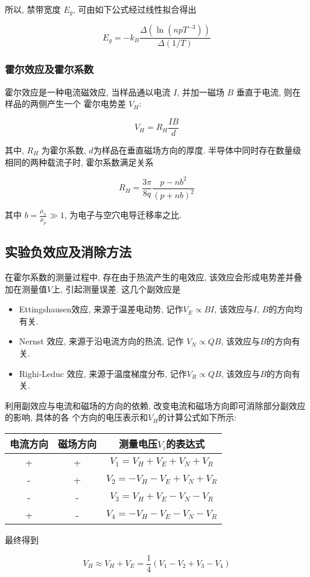 \documentclass[12pt,a4paper]{article}
\newcommand{\be}[1]{
    \begin{equation}
        #1
    \end{equation}
}
\begin{document}
所以, 禁带宽度 $E_g$, 可由如下公式经过线性拟合得出
\be{E_{g}=-k_{B} \frac{\Delta\left(\ln \left(n p T^{-3}\right)\right)}{\Delta(1 / T)}}

\subsubsection{霍尔效应及霍尔系数}
霍尔效应是一种电流磁效应, 当样品通以电流 $I$, 并加一磁场 $B$ 垂直于电流, 则在样品的两侧产生一个
霍尔电势差 $V_H$:
\be{V_{H}=R_{H} \frac{I B}{d}}
其中, $R_H$ 为霍尔系数, $d$为样品在垂直磁场方向的厚度.
半导体中同时存在数量级相同的两种载流子时, 霍尔系数满足关系
\be{R_{H}=\frac{3 \pi}{8 q} \frac{p-n b^{2}}{(p+n b)^{2}}}
其中 $b =\frac{\mu_n}{\mu_p}\gg 1$, 为电子与空穴电导迁移率之比.

\subsection{实验负效应及消除方法}
在霍尔系数的测量过程中, 存在由于热流产生的电效应, 该效应会形成电势差并叠加在测量值$V$上,
引起测量误差. 这几个副效应是
\begin{itemize}
    \item Ettingshausen效应, 来源于温差电动势, 记作$ V_E\propto  BI$, 该效应与$I$, $B$的方向均有关.
    \item Nernst 效应, 来源于沿电流方向的热流, 记作 $V_N \propto QB$, 该效应与$B$的方向有关.
    \item Righi-Leduc 效应, 来源于温度梯度分布, 记作$V_R \propto QB$, 该效应与$B$的方向有关.
\end{itemize}    

利用副效应与电流和磁场的方向的依赖, 改变电流和磁场方向即可消除部分副效应的影响, 具体的各
个方向的电压表示和$V_H$的计算公式如下所示:
\begin{table}[H]
    \centering
    \begin{tabular}{|c|c|c|}
    \hline
    电流方向 & 磁场方向 & 测量电压$V_i$的表达式 \\ \hline
    +    & +    &   $V_{1}=V_{H}+V_{E}+V_{N}+V_{R}$         \\ \hline
    -    & +    &    $V_{2}=-V_{H}-V_{E}+V_{N}+V_{R}$        \\ \hline
    -    & -    &    $V_{3}=V_{H}+V_{E}-V_{N}-V_{R}$        \\ \hline
    +    & -    &     $V_{4}=-V_{H}-V_{E}-V_{N}-V_{R}$       \\ \hline
    \end{tabular}
    \end{table}
最终得到
\be{V_{H} \approx V_{H}+V_{E}=\frac{1}{4}\left(V_{1}-V_{2}+V_{3}-V_{4}\right)}
\end{document}
